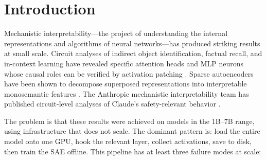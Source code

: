 \documentclass[11pt]{article}
\begin{document}
\begin{abstract}
Finally, we evaluate a feature-based safety classifier. A 40-feature classifier selected by differential frequency against a harm-relevant corpus reaches \textbf{0.7206} ROC-AUC on the held-out PKU-SafeRLHF test split ($n = 600$; 95\% CI [0.679, 0.760]). Selecting features by raw frequency instead is ineffective, scoring 0.564 with a confidence interval spanning chance. An LLM-judge baseline scores higher still (0.8545), so SAE features do not beat simply asking an instruction-tuned model---but the two agree on only 54\% of examples ($\kappa = 0.083$), and where they disagree ground truth is near a coin flip, indicating close to orthogonal failure modes. All experiments run on consumer Apple Silicon; the system requires no GPUs, no cloud, and no specialized interconnects. Code and data are available at \url{https://github.com/american-code/ResearchPapers}.
\end{abstract}

\section{Introduction}
\label{sec:intro}

Mechanistic interpretability---the project of understanding the internal representations and algorithms of neural networks---has produced striking results at small scale. Circuit analyses of indirect object identification, factual recall, and in-context learning have revealed specific attention heads and MLP neurons whose causal roles can be verified by activation patching \citep{wang2022ioi, meng2022rome, olsson2022induction}. Sparse autoencoders have been shown to decompose superposed representations into interpretable monosemantic features \citep{bricken2023monosemanticity, cunningham2023sparse}. The Anthropic mechanistic interpretability team has published circuit-level analyses of Claude's safety-relevant behavior \citep{lindsey2025biology}.

The problem is that these results were achieved on models in the 1B--7B range, using infrastructure that does not scale. The dominant pattern is: load the entire model onto one GPU, hook the relevant layer, collect activations, save to disk, then train the SAE offline. This pipeline has at least three failure modes at scale:
\end{document}
